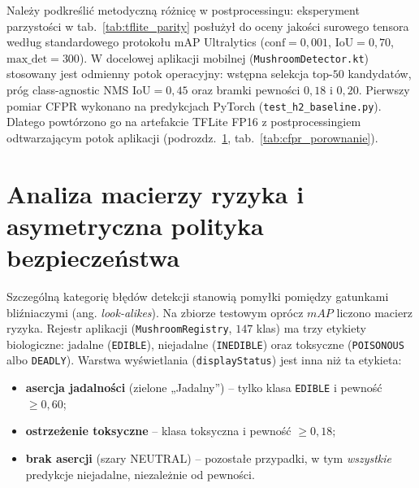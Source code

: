 Należy podkreślić metodyczną różnicę w postprocessingu: eksperyment parzystości w tab.~\ref{tab:tflite_parity} posłużył do oceny jakości surowego tensora według standardowego protokołu mAP Ultralytics ($\mathrm{conf}=0{,}001$, $\mathrm{IoU}=0{,}70$, $\mathrm{max\_det}=300$). W docelowej aplikacji mobilnej (\texttt{MushroomDetector.kt}) stosowany jest odmienny potok operacyjny: wstępna selekcja top-$50$ kandydatów, próg class-agnostic NMS $\mathrm{IoU}=0{,}45$ oraz bramki pewności $0{,}18$ i $0{,}20$. Pierwszy pomiar CFPR wykonano na predykcjach PyTorch (\texttt{test\_h2\_baseline.py}). Dlatego powtórzono go na artefakcie TFLite FP16 z postprocessingiem odtwarzającym potok aplikacji (podrozdz.~\ref{sec:safety_matrix}, tab.~\ref{tab:cfpr_porownanie}).

\section{Analiza macierzy ryzyka i asymetryczna polityka bezpieczeństwa}\label{sec:safety_matrix}
Szczególną kategorię błędów detekcji stanowią pomyłki pomiędzy gatunkami bliźniaczymi (ang. \textit{look-alikes}). Na zbiorze testowym oprócz $mAP$ liczono macierz ryzyka. Rejestr aplikacji (\texttt{MushroomRegistry}, $147$ klas) ma trzy etykiety biologiczne: jadalne (\texttt{EDIBLE}), niejadalne (\texttt{INEDIBLE}) oraz toksyczne (\texttt{POISONOUS} albo \texttt{DEADLY}). Warstwa wyświetlania (\texttt{displayStatus}) jest inna niż ta etykieta:
\begin{itemize}
 \item \textbf{asercja jadalności} (zielone „Jadalny”) -- tylko klasa \texttt{EDIBLE} i pewność $\ge 0{,}60$;
 \item \textbf{ostrzeżenie toksyczne} -- klasa toksyczna i pewność $\ge 0{,}18$;
 \item \textbf{brak asercji} (szary NEUTRAL) -- pozostałe przypadki, w tym \emph{wszystkie} predykcje niejadalne, niezależnie od pewności.
\end{itemize}
